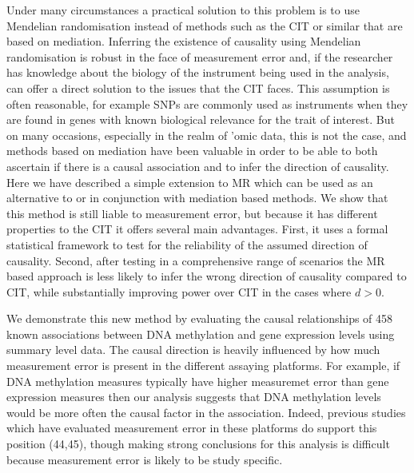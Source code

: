 \documentclass[]{article}
\begin{document}
Under many circumstances a practical solution to this problem is to use
Mendelian randomisation instead of methods such as the CIT or similar
that are based on mediation. Inferring the existence of causality using
Mendelian randomisation is robust in the face of measurement error and,
if the researcher has knowledge about the biology of the instrument
being used in the analysis, can offer a direct solution to the issues
that the CIT faces. This assumption is often reasonable, for example
SNPs are commonly used as instruments when they are found in genes with
known biological relevance for the trait of interest. But on many
occasions, especially in the realm of 'omic data, this is not the case,
and methods based on mediation have been valuable in order to be able to
both ascertain if there is a causal association and to infer the
direction of causality. Here we have described a simple extension to MR
which can be used as an alternative to or in conjunction with mediation
based methods. We show that this method is still liable to measurement
error, but because it has different properties to the CIT it offers
several main advantages. First, it uses a formal statistical framework
to test for the reliability of the assumed direction of causality.
Second, after testing in a comprehensive range of scenarios the MR based
approach is less likely to infer the wrong direction of causality
compared to CIT, while substantially improving power over CIT in the
cases where \(d > 0\).

We demonstrate this new method by evaluating the causal relationships of
458 known associations between DNA methylation and gene expression
levels using summary level data. The causal direction is heavily
influenced by how much measurement error is present in the different
assaying platforms. For example, if DNA methylation measures typically
have higher measuremet error than gene expression measures then our
analysis suggests that DNA methylation levels would be more often the
causal factor in the association. Indeed, previous studies which have
evaluated measurement error in these platforms do support this position
(44,45), though making strong conclusions for this analysis is difficult
because measurement error is likely to be study specific.
\end{document}
